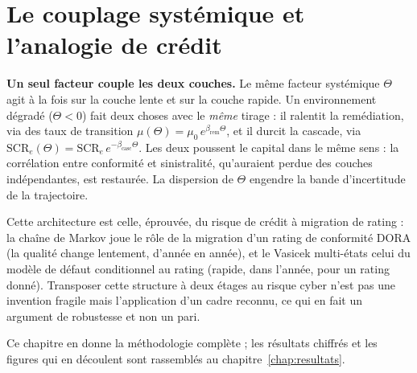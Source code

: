 

\section{Le couplage systémique et l'analogie de crédit}
\label{sec:couplage}

\begin{cle}
\textbf{Un seul facteur couple les deux couches.} Le même facteur systémique $\Theta$ agit à la
fois sur la couche lente et sur la couche rapide. Un environnement dégradé ($\Theta<0$) fait deux
choses avec le \emph{même} tirage : il ralentit la remédiation, via des taux de
transition $\mu(\Theta)=\mu_0\,e^{\beta_{\text{rem}}\Theta}$, et il durcit la cascade,
via $\mathrm{SCR}_e(\Theta)=\mathrm{SCR}_e\,e^{-\beta_{\text{casc}}\Theta}$. Les deux poussent le
capital dans le même sens : la corrélation entre conformité et sinistralité, qu'auraient perdue
des couches indépendantes, est restaurée. La dispersion de $\Theta$ engendre la bande
d'incertitude de la trajectoire.
\end{cle}

\noindent Cette architecture est celle, éprouvée, du risque de crédit à migration de
rating : la chaîne de Markov joue le rôle de la migration d'un \og rating de conformité DORA\fg{}
(la qualité change lentement, d'année en année), et le Vasicek multi-états celui du modèle de
défaut conditionnel au rating (rapide, dans l'année, pour un rating donné). Transposer
cette structure à deux étages au risque cyber n'est pas une invention fragile mais l'application
d'un cadre reconnu, ce qui en fait un argument de robustesse et non un pari.

Ce chapitre en donne la méthodologie complète ; les résultats chiffrés et les figures qui en
découlent sont rassemblés au chapitre~\ref{chap:resultats}.



